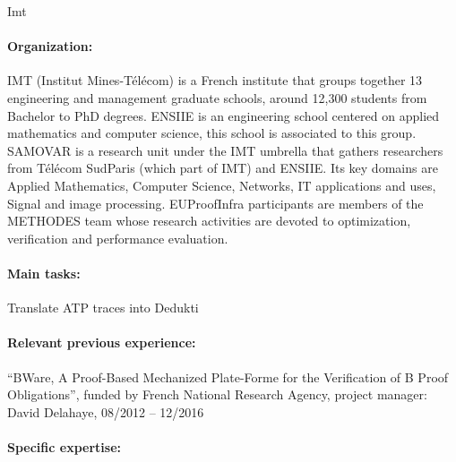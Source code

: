 \begin{sitedescription}{Imt}

\paragraph{Organization:}
IMT (Institut Mines-Télécom) is a French institute that groups together 13 engineering and management graduate schools, around 12,300 students from Bachelor to PhD degrees.
ENSIIE is an engineering school centered on applied mathematics and computer science, this school is associated to this group. SAMOVAR is a research unit under the IMT umbrella that gathers researchers from T\'el\'ecom SudParis (which part of IMT) and ENSIIE. Its key domains are Applied Mathematics,  Computer Science, Networks, IT applications and uses, Signal and image processing. EUProofInfra participants are members of the METHODES team whose research activities are devoted to
optimization, verification and performance evaluation.

\paragraph{Main tasks:}

\begin{compactitem}
\item Translate ATP traces into Dedukti 


\end{compactitem}


\paragraph{Relevant previous experience:}

\begin{compactitem}
\item ``BWare, A Proof-Based Mechanized Plate-Forme for the Verification of B Proof Obligations'',
funded by French National Research Agency, project manager: David
Delahaye, 08/2012 -- 12/2016
\end{compactitem}



\paragraph{Specific expertise:}



\end{sitedescription}
